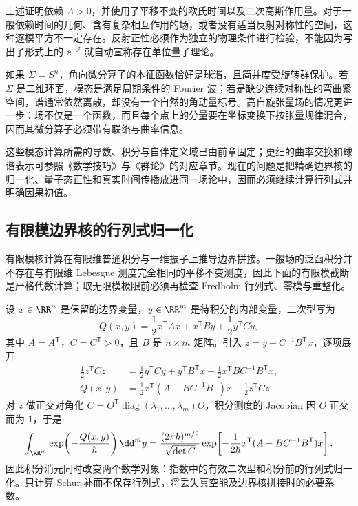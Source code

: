 上述证明依赖 $A>0$，并使用了平移不变的欧氏时间以及二次高斯作用量。对于一般依赖时间的几何、含有复杂相互作用的场，或者没有适当反射对称性的空间，这种逐模平方不一定存在。反射正性必须作为独立的物理条件进行检验，不能因为写出了形式上的 $\ee^{-\mathscr I}$ 就自动宣称存在单位量子理论。


如果 $\Sigma=S^{n}$，角向微分算子的本征函数恰好是球谐，且简并度受旋转群保护。若 $\Sigma$ 是二维环面，模态是满足周期条件的 Fourier 波；若是缺少连续对称性的弯曲紧空间，谱通常依然离散，却没有一个自然的角动量标号。高自旋张量场的情况更进一步：场不仅是一个函数，而且每个点上的分量要在坐标变换下按张量规律混合，因而其微分算子必须带有联络与曲率信息。

这些模态计算所需的导数、积分与自伴定义域已由前章固定；更细的曲率交换和球谐表示可参照《数学技巧》与《群论》的对应章节。现在的问题是把精确边界核的归一化、量子态正性和真实时间传播放进同一场论中，因而必须继续计算行列式并明确因果初值。

\subsection{有限模边界核的行列式归一化}
\label{subsec:ghs-r6-gaussian-gluing}

有限模核计算在有限维普通积分与一维振子上推导边界拼接。一般场的泛函积分并不存在与有限维 Lebesgue 测度完全相同的平移不变测度，因此下面的有限模截断是严格代数计算；取无限模极限前必须再检查 Fredholm 行列式、零模与重整化。

\begin{example}

设 $x\in\RR^n$ 是保留的边界变量，$y\in\RR^m$ 是待积分的内部变量，二次型写为
\[
Q(x,y)=\frac12x^{\mathsf T}Ax+x^{\mathsf T}By+
\frac12y^{\mathsf T}Cy,
\]
其中 $A=A^{\mathsf T}$，$C=C^{\mathsf T}>0$，且 $B$ 是 $n\times m$ 矩阵。引入 $z=y+C^{-1}B^{\mathsf T}x$，逐项展开
\begin{align*}
\frac12z^{\mathsf T}Cz
&=\frac12y^{\mathsf T}Cy+y^{\mathsf T}B^{\mathsf T}x
+\frac12x^{\mathsf T}BC^{-1}B^{\mathsf T}x,\\
Q(x,y)&=\frac12x^{\mathsf T}(A-BC^{-1}B^{\mathsf T})x
+\frac12z^{\mathsf T}Cz.
\end{align*}
对 $z$ 做正交对角化 $C=O^{\mathsf T}\operatorname{diag}(\lambda_1,\ldots,\lambda_m)O$，积分测度的 Jacobian 因 $O$ 正交而为 $1$，于是
\begin{equation}\label{eq:ghs-r6-schur-integral}
\int_{\RR^m}\exp\!\left(-\frac{Q(x,y)}\hbar\right)\dd^my
=\frac{(2\pi\hbar)^{m/2}}{\sqrt{\det C}}
\exp\!\left[-\frac1{2\hbar}x^{\mathsf T}(A-BC^{-1}B^{\mathsf T})x\right].
\end{equation}
因此积分消元同时改变两个数学对象：指数中的有效二次型和积分前的行列式归一化。只计算 Schur 补而不保存行列式，将丢失真空能及边界核拼接时的必要系数。

\end{example}

